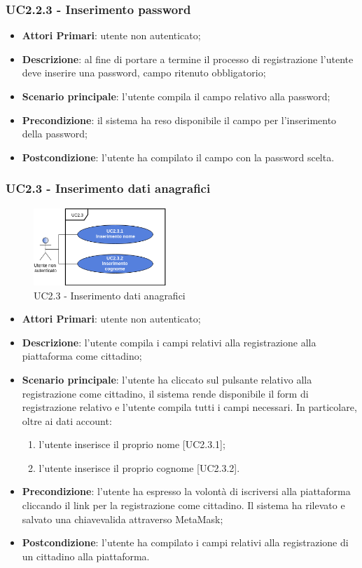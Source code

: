 \subsubsection{UC2.2.3 - Inserimento password}
\begin{itemize}
	\item \textbf{Attori Primari}: utente non autenticato;
	\item \textbf{Descrizione}: al fine di portare a termine il processo di registrazione l'utente deve inserire una password, campo ritenuto obbligatorio;
	\item \textbf{Scenario principale}: l'utente compila il campo relativo alla password;
	\item \textbf{Precondizione}: il sistema ha reso disponibile il campo per l'inserimento della password;
	\item \textbf{Postcondizione}: l'utente ha compilato il campo con la password scelta.
\end{itemize}
\subsubsection{UC2.3 - Inserimento dati anagrafici}
\begin{figure}[h]
	\includegraphics[width=5cm]{res/images/UC2-3Registrazione-cliente.png}
	\centering
	\caption{UC2.3 - Inserimento dati anagrafici}
\end{figure}
\begin{itemize}
	\item \textbf{Attori Primari}: utente non autenticato;
	\item \textbf{Descrizione}: l'utente compila i campi relativi alla registrazione alla piattaforma come cittadino;
	\item \textbf{Scenario principale}: l'utente ha cliccato sul pulsante relativo alla registrazione come cittadino, il sistema rende disponibile il form di registrazione relativo e l'utente compila tutti i campi necessari. In particolare, oltre ai dati account:
	\begin{enumerate}[label=\alph*.]
		\item l'utente inserisce il proprio nome [UC2.3.1];
		\item l'utente inserisce il proprio cognome [UC2.3.2].
	\end{enumerate}
	\item \textbf{Precondizione}: l'utente ha espresso la volontà di iscriversi alla piattaforma cliccando il link per la registrazione come cittadino. Il sistema ha rilevato e salvato una chiave\glosp valida attraverso MetaMask\glo;
	\item \textbf{Postcondizione}: l'utente ha compilato i campi relativi alla registrazione di un cittadino alla piattaforma.
\end{itemize}
